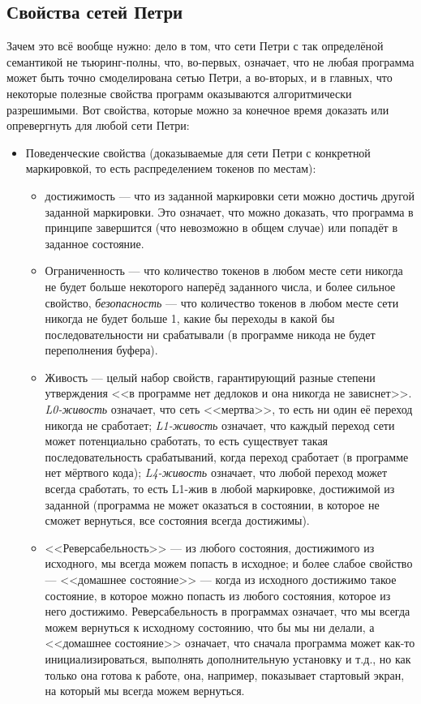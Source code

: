 \documentclass[a5paper]{article}
\begin{document}
\subsection{Свойства сетей Петри}

Зачем это всё вообще нужно: дело в том, что сети Петри с так определёной семантикой не тьюринг-полны, что, во-первых, означает, что не любая программа может быть точно смоделирована сетью Петри, а во-вторых, и в главных, что некоторые полезные свойства программ оказываются алгоритмически разрешимыми. Вот свойства, которые можно за конечное время доказать или опревергнуть для любой сети Петри:

\begin{itemize}
	\item Поведенческие свойства (доказываемые для сети Петри с конкретной маркировкой, то есть распределением токенов по местам):
	\begin{itemize}
		\item достижимость --- что из заданной маркировки сети можно достичь другой заданной маркировки. Это означает, что можно доказать, что программа в принципе завершится (что невозможно в общем случае) или попадёт в заданное состояние.
		\item Ограниченность --- что количество токенов в любом месте сети никогда не будет больше некоторого наперёд заданного числа, и более сильное свойство, \textit{безопасность} --- что количество токенов в любом месте сети никогда не будет больше 1, какие бы переходы в какой бы последовательности ни срабатывали (в программе никода не будет переполнения буфера).
		\item Живость --- целый набор свойств, гарантирующий разные степени утверждения <<в программе нет дедлоков и она никогда не зависнет>>. \textit{L0-живость} означает, что сеть <<мертва>>, то есть ни один её переход никогда не сработает; \textit{L1-живость} означает, что каждый переход сети может потенциально сработать, то есть существует такая последовательность срабатываний, когда переход сработает (в программе нет мёртвого кода); \textit{L4-живость} означает, что любой переход может всегда сработать, то есть L1-жив в любой маркировке, достижимой из заданной (программа не может оказаться в состоянии, в которое не сможет вернуться, все состояния всегда достижимы).
		\item <<Реверсабельность>> --- из любого состояния, достижимого из исходного, мы всегда можем попасть в исходное; и более слабое свойство --- <<домашнее состояние>> --- когда из исходного достижимо такое состояние, в которое можно попасть из любого состояния, которое из него достижимо. Реверсабельность в программах означает, что мы всегда можем вернуться к исходному состоянию, что бы мы ни делали, а <<домашнее состояние>> означает, что сначала программа может как-то инициализироваться, выполнять дополнительную установку и т.д., но как только она готова к работе, она, например, показывает стартовый экран, на который мы всегда можем вернуться.

\end{itemize}
\end{itemize}
\end{document}
